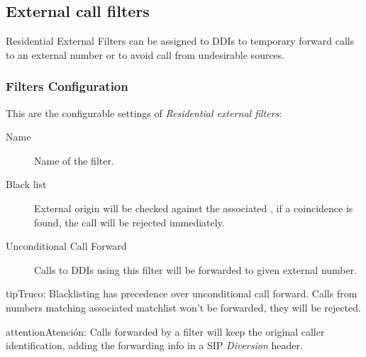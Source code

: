 \documentclass[letterpaper,10pt,spanish]{sphinxmanual}
\begin{document}
\subsection{External call filters}
\label{administration_portal/client/residential/external_call_filters:external-call-filters}\label{administration_portal/client/residential/external_call_filters:residential-filters}\label{administration_portal/client/residential/external_call_filters::doc}
Residential External Filters can be assigned to DDIs to temporary
forward calls to an external number or to avoid call from undesirable sources.


\subsubsection{Filters Configuration}
\label{administration_portal/client/residential/external_call_filters:filters-configuration}
This are the configurable settings of \emph{Residential external filters}:
\begin{description}
\item[{Name}] \leavevmode{}\label{administration_portal/client/residential/external_call_filters:term-name}
Name of the filter.

\item[{Black list}] \leavevmode{}\label{administration_portal/client/residential/external_call_filters:term-black-list}
External origin will be checked against the associated {\hyperref[administration_portal/client/vpbx/routing_tools/match_lists:match\string-lists]{}},
if a coincidence is found, the call will be rejected immediately.

\item[{Unconditional Call Forward}] \leavevmode{}\label{administration_portal/client/residential/external_call_filters:term-unconditional-call-forward}
Calls to DDIs using this filter will be forwarded to given external number.

\end{description}

\begin{notice}{tip}{Truco:}
Blacklisting has precedence over unconditional call forward. Calls from numbers
matching associated matchlist won't be forwarded, they will be rejected.
\end{notice}

\begin{notice}{attention}{Atención:}
Calls forwarded by a filter will keep the original
caller identification, adding the forwarding info in a SIP
\emph{Diversion} header.
\end{notice}
\end{document}
